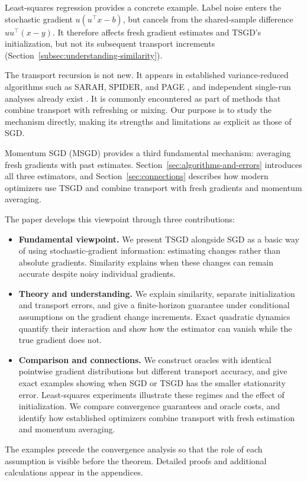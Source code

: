 Least-squares regression provides a concrete example. Label noise
enters the stochastic gradient $u(u^\top x-b)$, but cancels from the
shared-sample difference $uu^\top(x-y)$. It therefore affects fresh
gradient estimates and TSGD's initialization, but not its subsequent
transport increments (Section~\ref{subsec:understanding-similarity}).

The transport recursion is not new. It appears in established
variance-reduced algorithms such as SARAH, SPIDER, and PAGE
\citep{nguyen2017sarah,fang2018spider,li2021page}, and independent
single-run analyses already exist
\citep{nguyen2017sarah_nonconvex,nguyen2021inexact,sokolov2022nonconvex}.
It is commonly encountered as part of methods that combine transport
with refreshing or mixing. Our purpose is to study the mechanism
directly, making its strengths and limitations as explicit as those
of SGD.

Momentum SGD (MSGD) provides a third fundamental mechanism:
averaging fresh gradients with past estimates.
Section~\ref{sec:algorithms-and-errors} introduces all three estimators,
and Section~\ref{sec:connections} describes how modern optimizers use
TSGD and combine transport with fresh gradients and momentum averaging.

The paper develops this viewpoint through three contributions:
\begin{itemize}
\item \textbf{Fundamental viewpoint.} We present TSGD alongside SGD as
a basic way of using stochastic-gradient information: estimating changes
rather than absolute gradients. Similarity explains when these changes
can remain accurate despite noisy individual gradients.
\item \textbf{Theory and understanding.} We explain similarity, separate
initialization and transport errors, and give a finite-horizon guarantee
under conditional assumptions on the gradient change increments.
Exact quadratic dynamics quantify their interaction and show how the
estimator can vanish while the true gradient does not.
\item \textbf{Comparison and connections.} We construct oracles with
identical pointwise gradient distributions but different transport
accuracy, and give exact examples showing when SGD or TSGD has the
smaller stationarity error. Least-squares experiments illustrate these
regimes and the effect of initialization. We compare convergence
guarantees and oracle costs, and identify how established optimizers
combine transport with fresh estimation and momentum averaging.
\end{itemize}
The examples precede the convergence analysis so that the role of each
assumption is visible before the theorem. Detailed proofs and additional
calculations appear in the appendices.


